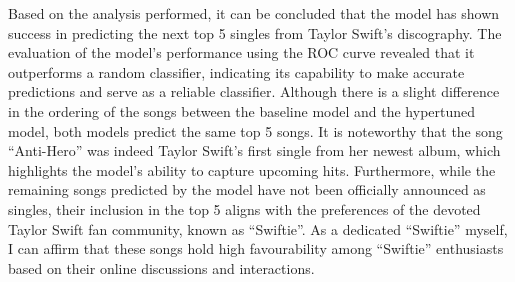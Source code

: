 \documentclass[11pt,preprint, authoryear]{elsarticle}
\numberwithin{equation}{section}
\numberwithin{figure}{section}
\numberwithin{table}{section}
\begin{document}
Based on the analysis performed, it can be concluded that the model has
shown success in predicting the next top 5 singles from Taylor Swift's
discography. The evaluation of the model's performance using the ROC
curve revealed that it outperforms a random classifier, indicating its
capability to make accurate predictions and serve as a reliable
classifier. Although there is a slight difference in the ordering of the
songs between the baseline model and the hypertuned model, both models
predict the same top 5 songs. It is noteworthy that the song
``Anti-Hero'' was indeed Taylor Swift's first single from her newest
album, which highlights the model's ability to capture upcoming hits.
Furthermore, while the remaining songs predicted by the model have not
been officially announced as singles, their inclusion in the top 5
aligns with the preferences of the devoted Taylor Swift fan community,
known as ``Swiftie''. As a dedicated ``Swiftie'' myself, I can affirm
that these songs hold high favourability among ``Swiftie'' enthusiasts
based on their online discussions and interactions.

\newpage


\end{document}
